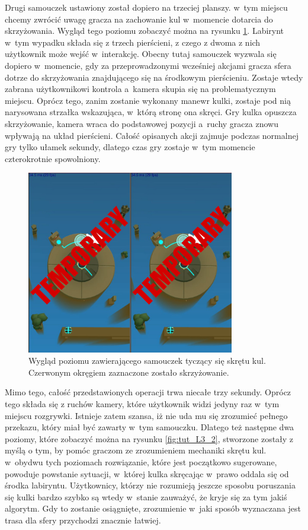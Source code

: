 \documentclass[a4paper,12pt,numbers=noenddot]{report}
\begin{document}
Drugi samouczek ustawiony został dopiero na trzeciej planszy. w~tym miejscu chcemy zwrócić uwagę gracza na zachowanie kul w~momencie dotarcia do skrzyżowania. Wygląd tego poziomu zobaczyć można na rysunku \ref{fig:tut_L3_1}. Labirynt w~tym wypadku składa się z trzech pierścieni, z czego z dwoma z nich użytkownik może wejść w~interakcję. Obecny tutaj samouczek wyzwala się dopiero w~momencie, gdy za przeprowadzonymi wcześniej akcjami gracza sfera dotrze do skrzyżowania znajdującego się na środkowym pierścieniu. Zostaje wtedy zabrana użytkownikowi kontrola a~kamera skupia się na problematycznym miejscu. Oprócz tego, zanim zostanie wykonany manewr kulki, zostaje pod nią narysowana strzałka wskazująca, w~którą stronę ona skręci. Gry kulka opuszcza skrzyżowanie, kamera wraca do podstawowej pozycji a~ruchy gracza znowu wpływają na układ pierścieni. Całość opisanych akcji zajmuje podczas normalnej gry tylko ułamek sekundy, dlatego czas gry zostaje w~tym momencie czterokrotnie spowolniony. 
\begin{figure}[h!]
	\centering
  	\includegraphics[height=8cm]{fig/tmp2.jpg}
	\caption{Wygląd poziomu zawierającego samouczek tyczący się skrętu kul. Czerwonym okręgiem zaznaczone zostało skrzyżowanie.}
	\label{fig:tut_L3_1}
\end{figure}
Mimo tego, całość przedstawionych operacji trwa niecałe trzy sekundy. Oprócz tego składa się z ruchów kamery, które użytkownik widzi jedyny raz w~tym miejscu rozgrywki. Istnieje zatem szansa, iż nie uda mu się zrozumieć pełnego przekazu, który miał być zawarty w~tym samouczku. Dlatego też następne dwa poziomy, które zobaczyć można na rysunku \ref{fig:tut_L3_2}, stworzone zostały z myślą o tym, by pomóc graczom ze zrozumieniem mechaniki skrętu kul. w~obydwu tych poziomach rozwiązanie, które jest początkowo sugerowane, powoduje powstanie sytuacji, w~której kulka skręcając w~prawo oddala się od środka labiryntu. Użytkownicy, którzy nie rozumieją jeszcze sposobu poruszania się kulki bardzo szybko są wtedy w~stanie zauważyć, że kryje się za tym jakiś algorytm. Gdy to zostanie osiągnięte, zrozumienie w~jaki sposób wyznaczana jest trasa dla sfery przychodzi znacznie łatwiej.
\end{document}
